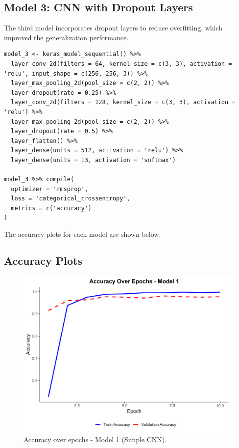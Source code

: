 \documentclass[a4paper,12pt]{article}
\begin{document}
\subsection{Model 3: CNN with Dropout Layers}
The third model incorporates dropout layers to reduce overfitting, which improved the generalization performance.

\begin{verbatim}
model_3 <- keras_model_sequential() %>%
  layer_conv_2d(filters = 64, kernel_size = c(3, 3), activation = 'relu', input_shape = c(256, 256, 3)) %>%
  layer_max_pooling_2d(pool_size = c(2, 2)) %>%
  layer_dropout(rate = 0.25) %>%
  layer_conv_2d(filters = 128, kernel_size = c(3, 3), activation = 'relu') %>%
  layer_max_pooling_2d(pool_size = c(2, 2)) %>%
  layer_dropout(rate = 0.5) %>%
  layer_flatten() %>%
  layer_dense(units = 512, activation = 'relu') %>%
  layer_dense(units = 13, activation = 'softmax')

model_3 %>% compile(
  optimizer = 'rmsprop',
  loss = 'categorical_crossentropy',
  metrics = c('accuracy')
)
\end{verbatim}


The accuracy plots for each model are shown below:

\subsection{Accuracy Plots}
\begin{figure}[H]
    \centering
    \includegraphics[width=0.8\linewidth]{results/accuracy_plot_model_1.png}
    \caption{Accuracy over epochs - Model 1 (Simple CNN).}
\end{figure}
\end{document}
